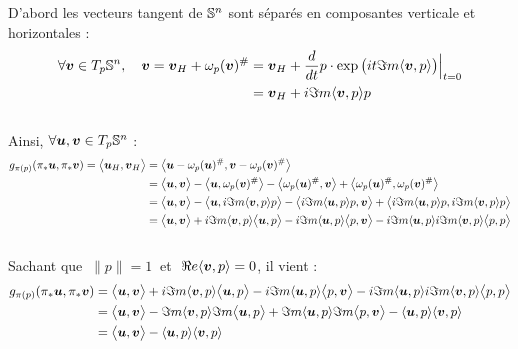 D'abord les vecteurs tangent de $\S{n}$ sont séparés en composantes verticale et horizontales :
\begin{align}
	\forall \bf{v}\in \tg[p]{\S{n}},\quad \bf{v} = \bf{v}_H + \omega_p(\bf{v})^\# &= \bf{v}_H + \frac{d}{dt}p\cdot \exp\big(it\Im m \langle \bf{v}, p \rangle\big)\Big|_{t=0} \\
	&= \bf{v}_H  + i\Im m \langle \bf{v}, p \rangle p
\end{align}
\\
Ainsi, $\forall \bf{u},\bf{v}\in \tg[p]{\S{n}}$ :
\begin{align*}
	g_{\pi(p)}( \pi_*\bf{u}, \pi_*\bf{v}) = \big\langle \bf{u}_H, \bf{v}_H \big\rangle &= \big\langle\bf{u} - \conn_p(\bf{u})^\#, \bf{v} - \conn_p(\bf{v})^\# \big\rangle \\
	&= \big\langle\bf{u}, \bf{v} \big\rangle  - \big\langle\bf{u}, \conn_p(\bf{v})^\# \big\rangle - \big\langle \conn_p(\bf{u})^\#, \bf{v} \big\rangle + \big\langle \conn_p(\bf{u})^\#, \conn_p(\bf{v})^\# \big\rangle \\
	&= \big\langle\bf{u}, \bf{v} \big\rangle  - \big\langle\bf{u},  i\Im m \langle \bf{v}, p \rangle p \big\rangle - \big\langle  i\Im m \langle \bf{u}, p \rangle p, \bf{v} \big\rangle + \big\langle  i\Im m \langle \bf{u}, p \rangle p,  i\Im m \langle \bf{v}, p \rangle p \big\rangle \\
	&= \big\langle\bf{u}, \bf{v} \big\rangle  + i\Im m \langle \bf{v}, p \rangle\big\langle\bf{u}, p \big\rangle - i\Im m \langle \bf{u}, p \rangle\big\langle p, \bf{v} \big\rangle - i\Im m \langle \bf{u}, p \rangle i\Im m \langle \bf{v}, p \rangle \big\langle p, p \big\rangle
\end{align*}
\\
Sachant que $\ \|p\|=1\ $ et $\ \Re e \langle \bf{v},p\rangle = 0$, il vient :
\begin{align*}
	g_{\pi(p)}( \pi_*\bf{u}, \pi_*\bf{v}) 
	&= \big\langle\bf{u}, \bf{v} \big\rangle  + i\Im m \langle \bf{v}, p \rangle\big\langle\bf{u}, p \big\rangle - i\Im m \langle \bf{u}, p \rangle\big\langle p, \bf{v} \big\rangle - i\Im m \langle \bf{u}, p \rangle i\Im m \langle \bf{v}, p \rangle \big\langle p, p \big\rangle \\
	&= \big\langle\bf{u}, \bf{v} \big\rangle  -\Im m \langle \bf{v}, p \rangle \Im m\big\langle\bf{u}, p \big\rangle + \Im m \langle \bf{u}, p \rangle \Im m \big\langle p, \bf{v} \big\rangle - \langle \bf{u}, p \rangle \langle \bf{v}, p \rangle\\
	&= \big\langle\bf{u}, \bf{v} \big\rangle -  \langle \bf{u}, p \rangle \langle \bf{v}, p \rangle
\end{align*}

